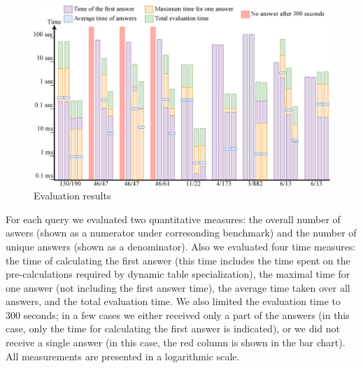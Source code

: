 
\begin{figure}[t]
  \includegraphics[width=1\textwidth]{eval_diagram.eps}
  \caption{Evaluation results}
  \label{fig:eval-diagram}
\end{figure}

 For each query we evaluated two quantitative measures: the overall number of aswers (shown as a numerator
under corresonding benchmark) and the number of unique answers (shown as a denominator). Also we evaluated four time measures: the time of calculating the first answer (this time includes the time
spent on the pre-calculations required by dynamic table specialization), the maximal time for one answer (not including the first answer time), the average time taken over all answers,
and the total evaluation time. We also limited the evaluation time to 300 seconds; in a few cases we either received only a part of the answers (in this case, only the time for
calculating the first answer is indicated), or we did not receive a single answer (in this case, the red column is shown in the bar chart). All measurements are presented in a logarithmic
scale.

